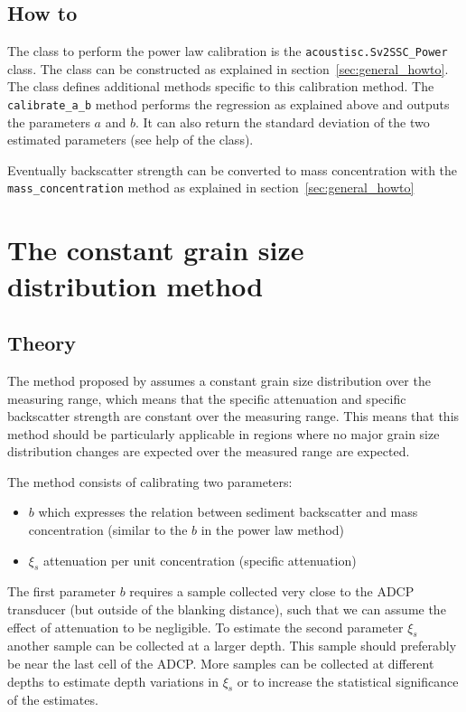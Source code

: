 \documentclass[]{article}
\begin{document}
\subsection{How to}
The class to perform the power law calibration is the \lstinline!acoustisc.Sv2SSC_Power! class. The class can be constructed as explained in section~\ref{sec:general_howto}. The class defines additional methods specific to this calibration method. The \lstinline!calibrate_a_b! method performs the regression as explained above and outputs the parameters $a$ and $b$. It can also return the standard deviation of the two estimated parameters (see help of the class). 

Eventually backscatter strength can be converted to mass concentration with the \lstinline!mass_concentration! method as explained in section~\ref{sec:general_howto}

\section{The constant grain size distribution method}

\subsection{Theory}
The method proposed by \citet{sassi2012} assumes a constant grain size distribution over the measuring range, which means that the specific attenuation and specific backscatter strength are constant over the measuring range. This means that this method should be particularly applicable in regions where no major grain size distribution changes are expected over the measured range are expected.

The method consists of calibrating two parameters:
\begin{itemize}
  \item $b$ which expresses the relation between sediment backscatter and mass concentration (similar to the $b$ in the power law method)
  \item $\xi_s$ attenuation per unit concentration (specific attenuation)
\end{itemize}
The first parameter $b$ requires a sample collected very close to the ADCP transducer (but outside of the blanking distance), such that we can assume the effect of attenuation to be negligible.
To estimate the second parameter $\xi_s$ another sample can be collected at a larger depth. This sample should preferably be near the last cell of the ADCP. More samples can be collected at different depths to estimate depth variations in $\xi_s$ or to increase the statistical significance of the estimates.
\end{document}
